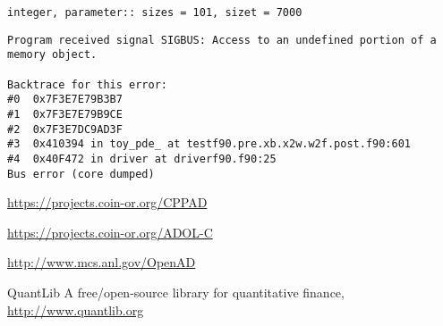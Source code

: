 \documentclass{amsart}
\theoremstyle{plain}
\numberwithin{equation}{section}
\begin{document}
\begin{verbatim}
integer, parameter:: sizes = 101, sizet = 7000
\end{verbatim}

\begin{verbatim}
Program received signal SIGBUS: Access to an undefined portion of a memory object.

Backtrace for this error:
#0  0x7F3E7E79B3B7
#1  0x7F3E7E79B9CE
#2  0x7F3E7DC9AD3F
#3  0x410394 in toy_pde_ at testf90.pre.xb.x2w.w2f.post.f90:601
#4  0x40F472 in driver at driverf90.f90:25
Bus error (core dumped)
\end{verbatim}

\begin{thebibliography}{4}

\url{https://projects.coin-or.org/CPPAD}

\url{https://projects.coin-or.org/ADOL-C}

\url{http://www.mcs.anl.gov/OpenAD}

QuantLib A free/open-source library for quantitative finance, \url{http://www.quantlib.org}

\end{thebibliography}
\end{document}
